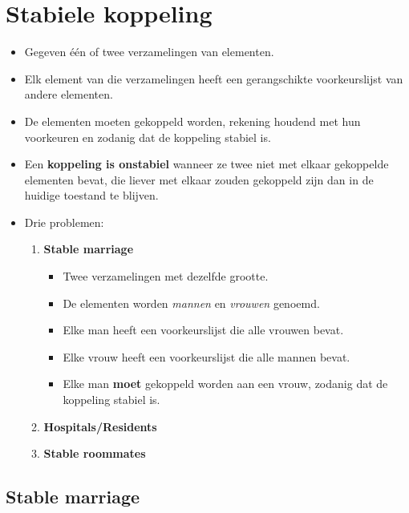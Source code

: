 \section{Stabiele koppeling}
\begin{itemize}
    \item Gegeven één of twee verzamelingen van elementen.
    \item Elk element van die verzamelingen heeft een gerangschikte voorkeurslijst van andere elementen.
    \item De elementen moeten gekoppeld worden, rekening houdend met hun voorkeuren en zodanig dat de koppeling stabiel is.
    \item Een \textbf{koppeling is onstabiel} wanneer ze twee niet met elkaar gekoppelde elementen bevat, die liever met elkaar zouden gekoppeld zijn dan in de huidige toestand te blijven.
    \item Drie problemen:
    \begin{enumerate}
        \item \textbf{Stable marriage}
        \begin{itemize}
            \item Twee verzamelingen met dezelfde grootte.
            \item De elementen worden \textit{mannen} en \textit{vrouwen} genoemd.
            \item Elke man heeft een voorkeurslijst die alle vrouwen bevat.
            \item Elke vrouw heeft een voorkeurslijst die alle mannen bevat.
            \item Elke man \textbf{moet} gekoppeld worden aan een vrouw, zodanig dat de koppeling stabiel is.
        \end{itemize}

        \item \textbf{Hospitals/Residents}

        \item \textbf{Stable roommates}
    \end{enumerate}
\end{itemize}

\subsection{Stable marriage}
